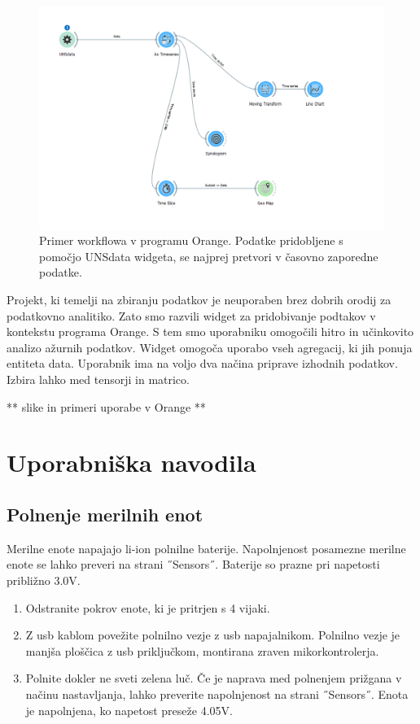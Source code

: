 \documentclass[a4paper, 12pt]{book}
\begin{document}
\begin{figure}[H]
    \centering
    \includegraphics[width=\linewidth]{slikovno_gradivo/Primer workflowa Orange.png}
    \caption{Primer workflowa v programu Orange. Podatke pridobljene s pomočjo UNSdata widgeta, se najprej pretvori v časovno zaporedne podatke.}
    \label{fig:workflow_primer}
\end{figure}


Projekt, ki temelji na zbiranju podatkov je neuporaben brez dobrih orodij za podatkovno analitiko. Zato smo razvili widget za pridobivanje podtakov v kontekstu programa Orange. S tem smo uporabniku omogočili hitro in učinkovito analizo ažurnih podatkov. 
Widget omogoča uporabo vseh agregacij, ki jih ponuja entiteta data. Uporabnik ima na voljo dva načina priprave izhodnih podatkov. Izbira lahko med tensorji in matrico. 

 ** slike in primeri uporabe v Orange **
 
 
 \chapter{Uporabniška navodila}


\section{Polnenje merilnih enot}

Merilne enote napajajo li-ion polnilne baterije. Napolnjenost posamezne merilne enote se lahko preveri na strani ˝Sensors˝. Baterije so prazne pri napetosti približno 3.0V.

\begin{enumerate}
    \item Odstranite pokrov enote, ki je pritrjen s 4 vijaki.
    \item Z usb kablom povežite polnilno vezje z usb napajalnikom. Polnilno vezje je manjša ploščica z usb priključkom, montirana zraven mikorkontrolerja.
    \item Polnite dokler ne sveti zelena luč. Če je naprava med polnenjem prižgana v načinu nastavljanja, lahko preverite napolnjenost na strani ˝Sensors˝. Enota je napolnjena, ko napetost preseže 4.05V.
\end{enumerate}
\end{document}
